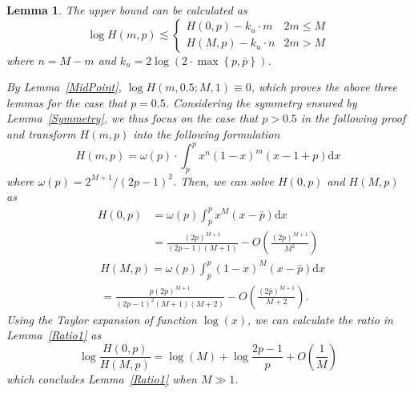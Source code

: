 \documentclass{article}
\makeatletter
\newcounter{lemmas}
\newtheorem{lemma}[lemmas]{Lemma}
\renewenvironment{proof}[1][\proofname]{\par
  \vspace{-\topsep}%
  \pushQED{\qed}%
  \normalfont
  \topsep0pt \partopsep0pt %
  \trivlist
  \item[\hskip\labelsep
        \itshape
    #1\@addpunct{.}]\ignorespaces
}{%
  \popQED\endtrivlist\@endpefalse
  \addvspace{0pt plus 0pt} %
}
\makeatother
\begin{document}
\begin{lemma}
\label{UpBound1}
The upper bound can be calculated as
\begin{equation*}
\log H(m,p)\lesssim \left\{
    \begin{array}{cl}
    H(0,p)- k_u\cdot m& 2m\leq M\\
    H(M,p)- k_u\cdot n& 2m>M
    \end{array}\right.
\end{equation*}
where $n=M-m$ and $k_u=2\log\left(2\cdot \max\left\{p,\bar{p}\right\}\right)$.
\begin{proof}
By Lemma~\ref{MidPoint}, $\log H(m, 0.5;M,1)\equiv 0$, which proves the above three lemmas for the case that $p=0.5$. Considering the symmetry ensured by Lemma~\ref{Symmetry}, we thus focus on the case that $p>0.5$ in the following proof and transform $H(m,p)$ into the following formulation
\begin{equation}
H(m,p)=\omega(p)\cdot \int_{\bar{p}}^{p}x^n(1-x)^m(x-1+p)\mathrm{d}x
\end{equation}
where $\omega(p)=2^{M+1}/(2p-1)^2$. Then, we can solve $H(0,p)$ and $H(M,p)$ as
\begin{equation}
\begin{split}
H(0,p)&=\omega(p)\int_{\bar{p}}^{p}x^M(x-\bar{p})\mathrm{d}x\\
&=\frac{(2p)^{M+1}}{(2p-1)(M+1)} - O\left(\frac{(2p)^{M+1}}{M^2}\right)
\end{split}
\end{equation}
\begin{equation}
\begin{split}
&H(M,p)=\omega(p)\int_{\bar{p}}^{p}(1-x)^M(x-\bar{p})\mathrm{d}x\\
&=\frac{p(2p)^{M+1}}{(2p-1)^2(M+1)(M+2)} - O\left(\frac{(2\bar{p})^{M+1}}{M+2}\right).
\end{split}
\end{equation}
Using the Taylor expansion of function $\log(x)$, we can calculate the ratio in Lemma~\ref{Ratio1} as
\begin{equation}
\log\frac{H(0,p)}{H(M,p)}=\log(M)+\log\frac{2p-1}{p}+O\left(\frac{1}{M}\right)
\end{equation}
which concludes Lemma~\ref{Ratio1} when $M\gg 1$.


\end{proof}
\end{lemma}
\end{document}
